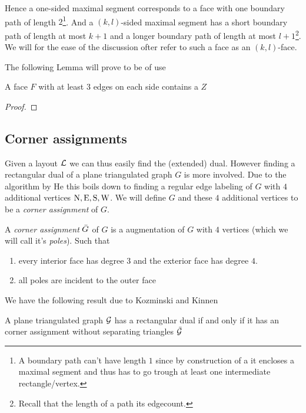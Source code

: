     Hence a one-sided maximal segment corresponds to a face with one boundary path of length $2$\footnote{A boundary path can't have length $1$ since by construction of a \rel it encloses a maximal segment and thus has to go trough at least one intermediate rectangle/vertex.}. And a $(k,l)$-sided maximal segment has a short boundary path of length at most $k+1$ and a longer boundary path of length at most $l+1$\footnote{Recall that the length of a path its edgecount.}.
    We will for the ease of the discussion ofter refer to such a face as an $(k,l)$-face.

    The following Lemma will prove to be of use
    \begin{lemma}
    \label{lm:zInRedFace}
    A face $F$ with at least $3$ edges on each side contains a $Z$
    \end{lemma}
    \begin{proof}
    \end{proof}

\subsection{Corner assignments}
  Given a layout $\mathcal{L}$ we can thus easily find the (extended) dual. However finding a rectangular dual of a plane triangulated graph $G$ is more involved. Due to the algorithm by He \cite{He1993} this boils down to finding a regular edge labeling of $G$ with $4$ additional vertices $\mathrm{N}, \mathrm{E}, \mathrm{S}, \mathrm{W}$. We will define $G$ and these $4$ additional vertices to be a \emph{corner assignment} of $G$.

  \begin{defi}
    A \emph{corner assignment} $\bar{G}$ of $G$ is a augmentation of $G$ with $4$ vertices (which we will call it's \emph{poles}). Such that
    \begin{enumerate}
    \item every interior face has degree $3$ and the exterior face has degree $4$.
    \item all poles are incident to the outer face
    \end{enumerate}
  \end{defi}

  We have the following result due to Kozminski and Kinnen

  \begin{thrm}
    A plane triangulated graph $\mathcal{G}$ has a rectangular dual if and only if it has an corner assignment without separating triangles $\bar{\mathcal{G}}$
  \end{thrm}

